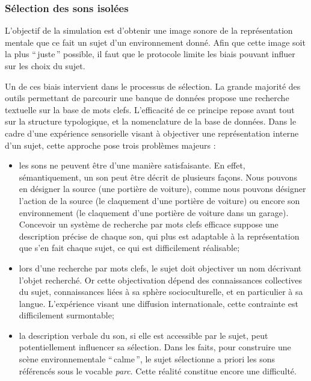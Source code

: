 \subsubsection{Sélection des sons isolées}

L'objectif de la simulation est d'obtenir une image sonore de la représentation mentale que ce fait un sujet d'un environnement donné. Afin que cette image soit la plus ``\,juste\,'' possible, il faut que le protocole limite les biais pouvant influer sur les choix du sujet.

Un de ces biais intervient dans le processus de sélection. La grande majorité des outils permettant de parcourir une banque de données propose une recherche textuelle sur la base de mots clefs. L’efficacité de ce principe repose avant tout sur la structure typologique, et la nomenclature de la base de données. Dans le cadre d'une expérience sensorielle visant à objectiver une représentation interne d'un sujet, cette approche pose trois problèmes majeurs :

\begin{itemize}
\item les sons ne peuvent être  d'une manière satisfaisante. En effet, sémantiquement, un son peut être décrit de plusieurs façons. Nous pouvons en désigner la source (une portière de voiture), comme nous pouvons désigner l'action de la source (le claquement d’une portière de voiture) ou encore son environnement (le claquement d’une portière de voiture dans un garage). Concevoir un système de recherche par mots clefs efficace suppose une description précise de chaque son, qui plus est adaptable à la représentation que s’en fait chaque sujet, ce qui est difficilement réalisable;

\item lors d'une recherche par mots clefs, le sujet doit objectiver un nom décrivant l'objet recherché. Or cette objectivation dépend des connaissances collectives du sujet, connaissances liées à sa sphère socioculturelle, et en particulier à sa langue. L'expérience visant une diffusion internationale, cette contrainte est difficilement surmontable;

\item la description verbale du son, si elle est accessible par le sujet, peut potentiellement influencer sa sélection. Dans les faits, pour construire une scène environnementale ``\,calme\,'', le sujet sélectionne a priori les sons référencés sous le vocable \emph{parc}. Cette réalité constitue encore une difficulté.
\end{itemize}

